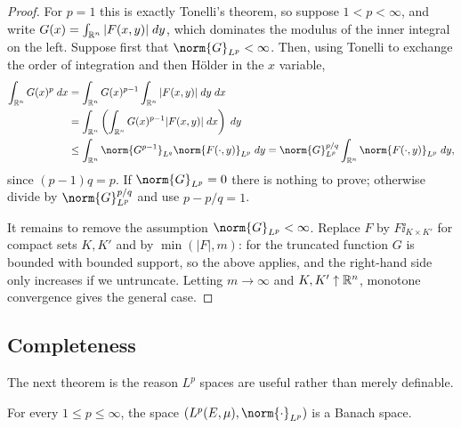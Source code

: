 \documentclass[a4paper]{scrartcl}
\begin{document}
\begin{proof}
	For $p = 1$ this is exactly Tonelli's theorem, so suppose $1 < p < \infty$, and write $G(x) = \int_{\mathbb{R}^n}|F(x,y)|\; d y$, which dominates the modulus of the inner integral on the left. Suppose first that $\norm{G}_{L^p} < \infty$. Then, using Tonelli to exchange the order of integration and then H\"older in the $x$ variable,
	\begin{align*}
		\int_{\R^n} G(x)^p \dd x &= \int_{\R^n}G(x)^{p-1}\int_{\R^n}|F(x,y)|\dd y \dd x \\
		&= \int_{\R^n}\left( \int_{\R^n}G(x)^{p-1}|F(x,y)|\dd x\right)\dd y \\
		&\le \int_{\R^n}\norm{G^{p-1}}_{L^q}\norm{F(\cdot,y)}_{L^p}\dd y = \norm{G}_{L^p}^{p/q}\int_{\R^n}\norm{F(\cdot,y)}_{L^p}\dd y,
	\end{align*}
	since $(p-1)q = p$. If $\norm{G}_{L^p} = 0$ there is nothing to prove; otherwise divide by $\norm{G}_{L^p}^{p/q}$ and use $p - p/q = 1$.

	It remains to remove the assumption $\norm{G}_{L^p}<\infty$. Replace $F$ by $F\ii_{K \times K'}$ for compact sets $K, K'$ and by $\min(|F|, m)$: for the truncated function $G$ is bounded with bounded support, so the above applies, and the right-hand side only increases if we untruncate. Letting $m \to \infty$ and $K, K' \uparrow \mathbb{R}^n$, monotone convergence gives the general case.
\end{proof}

\subsection{Completeness}

The next theorem is the reason $L^p$ spaces are useful rather than merely definable.

\begin{theorem}\label{thm:rieszfischer}
	For every $1 \le p \le \infty$, the space $(L^p(E,\mu), \norm{\cdot}_{L^p})$ is a Banach space.
\end{theorem}
\end{document}
